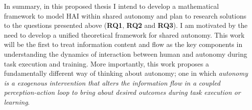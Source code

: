 \documentclass[12pt]{article}
\newcommand{\POINTS}[1]{{\textbf{\color{red}{#1}}}}
\begin{document}
In summary, in this proposed thesis I intend to develop a mathematical framework to model HAI within shared autonomy and plan to research solutions to the questions presented above (\textbf{RQ1}, \textbf{RQ2} and \textbf{RQ3}). I am motivated by the need to develop a unified theoretical framework for shared autonomy. This work will be the first to treat information content and flow as the key components in understanding the dynamics of interaction between human and autonomy during task execution and training. More importantly, this work proposes a fundamentally different way of thinking about autonomy; one in which \textit{autonomy is a exogenous intervention that alters the information flow in a coupled perception-action loop to bring about desired outcomes during task execution or learning}.



%





\end{document}
